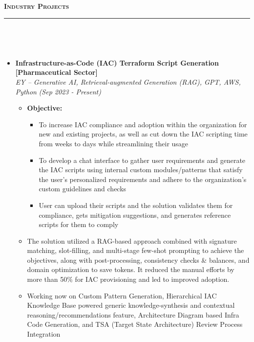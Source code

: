 \documentclass[a4paper,10pt]{article}
\newcommand{\isep}{-2 pt}
\newcommand{\lsep}{-0.5cm}
\newcommand{\resheading}[1]{{\small
        {
            \begin{minipage}
                {0.992\textwidth}\textbf{{\textsc{#1 \vphantom{p\^{E}} }}}
                \\[-0.3cm]
                \hrule
            \end{minipage}
            \\[-0.5cm]
        }
 }}
\begin{document}
\noindent
\resheading{\textbf{\large Industry Projects}}\\[\lsep] 
\begin{itemize}
\item \textbf{Infrastructure-as-Code (IAC) Terraform Script Generation [Pharmaceutical Sector]}  \\
    \emph{EY -- Generative AI, Retrieval-augmented Generation (RAG), GPT, AWS, Python} \hfill {\emph{(Sep 2023 - Present)}}
    \\[-0.5cm]
    \begin{itemize}\itemsep \isep
    \item \textbf{Objective:} 
        \begin{itemize}\itemsep \isep
        \item To increase IAC compliance and adoption within the organization for new and existing projects, as well as cut down the IAC scripting time from weeks to days while streamlining their usage
        \item To develop a chat interface to gather user requirements and generate the IAC scripts using internal custom modules/patterns that satisfy the user's personalized requirements and adhere to the organization's custom guidelines and checks
        \item User can upload their scripts and the solution validates them for compliance, gets mitigation suggestions, and generates reference scripts for them to comply
        \end{itemize}
    \item The solution utilized a RAG-based approach combined with signature matching, slot-filling, and multi-stage few-shot prompting to achieve the objectives, along with post-processing, consistency checks \& balances, and domain optimization to save tokens. It reduced the manual efforts by more than 50\% for IAC provisioning and led to improved adoption.
    \item Working now on Custom Pattern Generation, Hierarchical IAC Knowledge Base powered generic knowledge-synthesis and contextual reasoning/recommendations feature, Architecture Diagram based Infra Code Generation, and TSA (Target State Architecture) Review Process Integration
    \\ [-0.5cm]
    \end{itemize}


\end{itemize}
\end{document}
